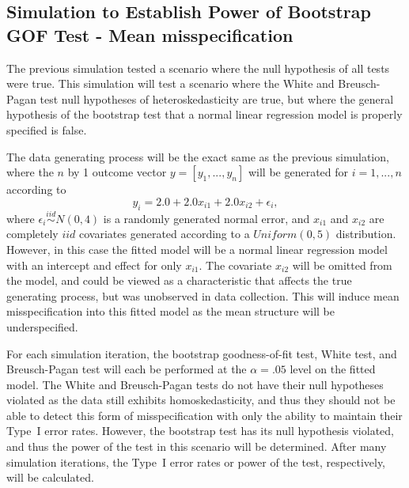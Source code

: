 		\subsection{Simulation to Establish Power of Bootstrap GOF Test - Mean misspecification}

		The previous simulation tested a scenario where the null hypothesis of all tests were true. This simulation will test a scenario where the White and
		Breusch-Pagan test null hypotheses of heteroskedasticity are true, but where the general hypothesis of the bootstrap test that a normal linear regression model is properly
		specified is false.

		The data generating process will be the exact same as the previous simulation, where the $n$ by 1 outcome vector $y = [y_1,...,y_n]$ will be generated
		for $i = 1,...,n$ according to
		\begin{equation}
			y_i = 2.0 + 2.0 x_{i1} + 2.0 x_{i2} + \epsilon_i , 
		\end{equation}
		where $\epsilon_i \stackrel{iid}{\sim} N(0,4)$ is a randomly generated normal error, and $x_{i1}$ and $x_{i2}$ are completely $iid$ covariates generated according to
		a $Uniform(0,5)$ distribution. However, in this case the fitted model will be a normal linear regression model with an intercept and effect for only
		$x_{i1}$. The covariate $x_{i2}$ will be omitted from the model, and could be viewed as a characteristic that affects the true generating process, but
		was unobserved in data collection. This will induce mean misspecification into this fitted model as the mean structure will be underspecified.

		For each simulation iteration, the bootstrap goodness-of-fit test, White test, and Breusch-Pagan test will each be performed at the $\alpha = .05$ level on the 
		fitted model. The White and Breusch-Pagan tests do not have their null hypotheses violated as the data still exhibits homoskedasticity, and thus they should not be able to
		detect this form of misspecification with only the ability to maintain their Type~I error rates. However, the bootstrap test has its null hypothesis violated,
		and thus the power of the test in this scenario will be determined. After many simulation iterations, the Type~I error rates or power of the test, respectively,
		will be calculated.

